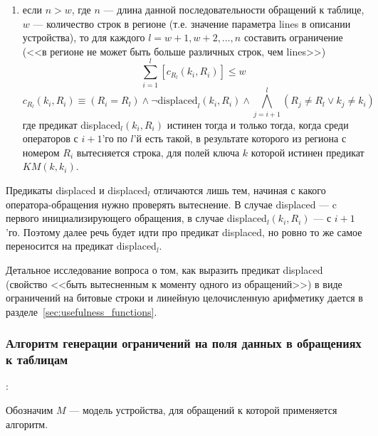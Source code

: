 \begin{enumerate}
    \item если $n > w$, где $n$ --- длина данной последовательности обращений к таблице, $w$ --- количество строк в регионе (т.е. значение параметра lines в описании устройства), то для каждого $l = w+1, w+2, \dots, n$ составить ограничение (<<в регионе не может быть больше различных строк, чем lines>>)
$$\sum_{i=1}^l [c_{R_l} (k_i, R_i)] \leqslant w$$
$$c_{R_l} (k_i, R_i) \equiv (R_i = R_l ) \wedge \neg \mbox{displaced}_l (k_i, R_i) \wedge \bigwedge_{j=i+1}^{l} (R_j \neq R_l \vee k_j \neq k_i)$$
где предикат displaced$_l (k_i, R_i)$ истинен тогда и только тогда, когда среди операторов с $i+1$'го по $l$'й есть такой, в результате которого из региона с номером $R_i$ вытесняется строка, для полей ключа $k$ которой истинен предикат $KM(k, k_i)$.
\end{enumerate}

Предикаты displaced и displaced$_l$ отличаются лишь тем, начиная с какого оператора-обращения нужно проверять вытеснение. В случае displaced --- c первого инициализирующего обращения, в случае displaced$_l(k_i, R_i)$ --- с $i+1$'го. Поэтому далее речь будет идти про предикат displaced, но ровно то же самое переносится на предикат displaced$_l$.

Детальное исследование вопроса о том, как выразить предикат displaced (свойство <<быть вытесненным к моменту одного из обращений>>) в виде ограничений на битовые строки и линейную целочисленную арифметику дается в разделе~\ref{sec:usefulness_functions}.

\subsubsection*{Алгоритм генерации ограничений на поля данных в обращениях к таблицам}:

Обозначим $M$ --- модель устройства, для обращений к которой применяется алгоритм.

